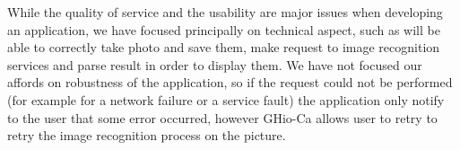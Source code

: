 While the quality of service and the usability are major issues when developing 
an application, we have focused principally on technical aspect, such as will be 
able to correctly take photo and save them, make request to image recognition 
services and parse result in order to display them. We have not focused our 
affords on robustness of the application, so if the request could not be 
performed (for example for a network failure or a service fault) the application 
only notify to the user that some error occurred, however GHio-Ca allows user to 
retry to retry the image recognition process on the picture.






